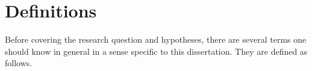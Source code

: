 \section{Definitions}
\label{sec:definitions}

Before covering the research question and hypotheses, there are several terms one should know in general in a sense specific to this dissertation. They are defined as follows.

